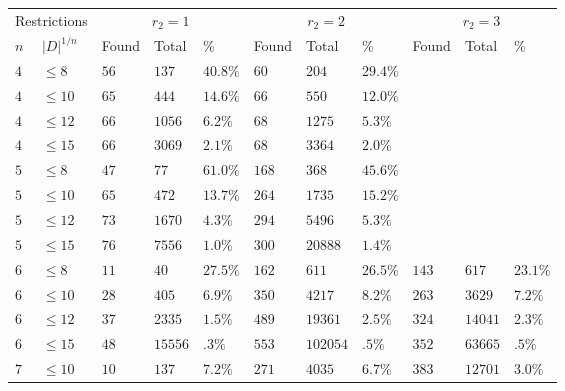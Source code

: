 \documentclass[10pt]{amsart}
\numberwithin{equation}{theorem}
\theoremstyle{definition}
\begin{document}
\begin{figure}[h]
  \centering
  {\small
  \begin{tabular}{|ll|lll|lll|lll|} \hline
    \multicolumn{2}{|l|}{Restrictions} & \multicolumn{3}{c|}{$r_2 = 1$} & \multicolumn{3}{c|}{$r_2 = 2$} & \multicolumn{3}{c|}{$r_2 = 3$} \\
    $n$ & $|D|^{1/n}$ & {\small Found} & {\small Total}& \% & {\small Found} & {\small Total}& \% & {\small Found} & {\small Total}& \% \\ \hline
    $4$ & $\le 8$ & $56$ & $137$ & $40.8\%$ & $60$ & $204$ & $29.4\%$ & & & \\
    $4$ & $\le 10$ & $65$ & $444$ & $14.6\%$ & $66$ & $550$ & $12.0\%$ & & & \\
    $4$ & $\le 12$ & $66$ & $1056$ & $6.2\%$ & $68$ & $1275$ & $5.3\%$ & & & \\
    $4$ & $\le 15$ & $66$ & $3069$ & $2.1\%$ & $68$ & $3364$ & $2.0\%$ & & & \\
    $5$ & $\le 8$ & $47$ & $77$ & $61.0\%$ & $168$ & $368$ & $45.6\%$ & & & \\
    $5$ & $\le 10$ & $65$ & $472$ & $13.7\%$ & $264$ & $1735$ & $15.2\%$ & & & \\
    $5$ & $\le 12$ & $73$ & $1670$ & $4.3\%$ & $294$ & $5496$ & $5.3\%$ & & & \\
    $5$ & $\le 15$ & $76$ & $7556$ & $1.0\%$ & $300$ & $20888$ & $1.4\%$ & & & \\
    $6$ & $\le 8$ & $11$ & $40$ & $27.5\%$ & $162$ & $611$ & $26.5\%$ & $143$ & $617$ & $23.1\%$ \\
    $6$ & $\le 10$ & $28$ & $405$ & $6.9\%$ & $350$ & $4217$ & $8.2\%$ & $263$ & $3629$ & $7.2\%$ \\
    $6$ & $\le 12$ & $37$ & $2335$ & $1.5\%$ & $489$ & $19361$ & $2.5\%$ & $324$ & $14041$ & $2.3\%$ \\
    $6$ & $\le 15$ & $48$ & $15556$ & $.3\%$ & $553$ & $102054$ & $.5\%$ & $352$ & $63665$ & $.5\%$ \\
    $7$ & $\le 10$ & $10$ & $137$ & $7.2\%$ & $271$ & $4035$ & $6.7\%$ & $383$ & $12701$ & $3.0\%$ \\

\end{tabular}}
\end{figure}
\end{document}
